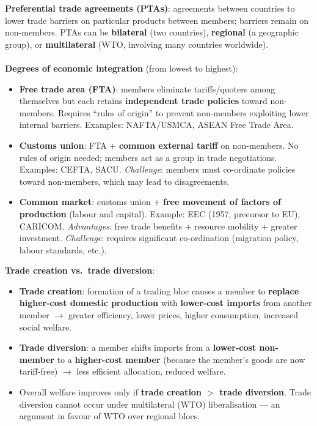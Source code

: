 \textbf{Preferential trade agreements (PTAs)}: agreements between countries to lower trade barriers on particular products between members; barriers remain on non-members. PTAs can be \textbf{bilateral} (two countries), \textbf{regional} (a geographic group), or \textbf{multilateral} (WTO, involving many countries worldwide).
\\\\
\textbf{Degrees of economic integration} (from lowest to highest):
\begin{itemize}
  \item \textbf{Free trade area (FTA)}: members eliminate tariffs/quoters among themselves but each retains \textbf{independent trade policies} toward non-members. Requires ``rules of origin'' to prevent non-members exploiting lower internal barriers. Examples: NAFTA/USMCA, ASEAN Free Trade Area.
  \item \textbf{Customs union}: FTA + \textbf{common external tariff} on non-members. No rules of origin needed; members act as a group in trade negotiations. Examples: CEFTA, SACU. \textit{Challenge}: members must co-ordinate policies toward non-members, which may lead to disagreements.
  \item \textbf{Common market}: customs union + \textbf{free movement of factors of production} (labour and capital). Example: EEC (1957, precursor to EU), CARICOM. \textit{Advantages}: free trade benefits + resource mobility + greater investment. \textit{Challenge}: requires significant co-ordination (migration policy, labour standards, etc.).
\end{itemize}
\textbf{Trade creation vs.\ trade diversion}:
\begin{itemize}
  \item \textbf{Trade creation}: formation of a trading bloc causes a member to \textbf{replace higher-cost domestic production} with \textbf{lower-cost imports} from another member $\to$ greater efficiency, lower prices, higher consumption, increased social welfare.
  \item \textbf{Trade diversion}: a member shifts imports from a \textbf{lower-cost non-member} to a \textbf{higher-cost member} (because the member's goods are now tariff-free) $\to$ less efficient allocation, reduced welfare.
  \item Overall welfare improves only if \textbf{trade creation $>$ trade diversion}. Trade diversion cannot occur under multilateral (WTO) liberalisation --- an argument in favour of WTO over regional blocs.
\end{itemize}
